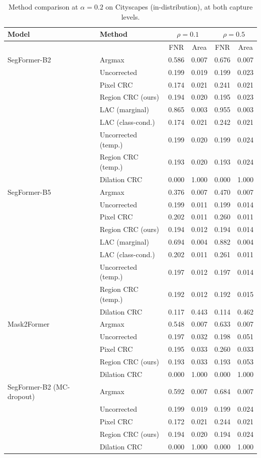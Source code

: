 \begin{table}[t]
\centering
\caption{Method comparison at $\alpha=0.2$ on Cityscapes (in-distribution), at both capture levels.}
\label{tab:baselines}
\scriptsize
\setlength{\tabcolsep}{2.5pt}
\begin{tabular}{llcccc}
\toprule
Model & Method & \multicolumn{2}{c}{$\rho=0.1$} & \multicolumn{2}{c}{$\rho=0.5$} \\
\midrule
 & & FNR & Area & FNR & Area \\
\midrule
SegFormer-B2 & Argmax & 0.586 & 0.007 & 0.676 & 0.007 \\
 & Uncorrected & 0.199 & 0.019 & 0.199 & 0.023 \\
 & Pixel CRC & 0.174 & 0.021 & 0.241 & 0.021 \\
 & Region CRC (ours) & 0.194 & 0.020 & 0.195 & 0.023 \\
 & LAC (marginal) & 0.865 & 0.003 & 0.955 & 0.003 \\
 & LAC (class-cond.) & 0.174 & 0.021 & 0.242 & 0.021 \\
 & Uncorrected (temp.) & 0.199 & 0.020 & 0.199 & 0.024 \\
 & Region CRC (temp.) & 0.193 & 0.020 & 0.193 & 0.024 \\
 & Dilation CRC & 0.000 & 1.000 & 0.000 & 1.000 \\
\addlinespace
SegFormer-B5 & Argmax & 0.376 & 0.007 & 0.470 & 0.007 \\
 & Uncorrected & 0.199 & 0.011 & 0.199 & 0.014 \\
 & Pixel CRC & 0.202 & 0.011 & 0.260 & 0.011 \\
 & Region CRC (ours) & 0.194 & 0.012 & 0.194 & 0.014 \\
 & LAC (marginal) & 0.694 & 0.004 & 0.882 & 0.004 \\
 & LAC (class-cond.) & 0.202 & 0.011 & 0.261 & 0.011 \\
 & Uncorrected (temp.) & 0.197 & 0.012 & 0.197 & 0.014 \\
 & Region CRC (temp.) & 0.192 & 0.012 & 0.192 & 0.015 \\
 & Dilation CRC & 0.117 & 0.443 & 0.114 & 0.462 \\
\addlinespace
Mask2Former & Argmax & 0.548 & 0.007 & 0.633 & 0.007 \\
 & Uncorrected & 0.197 & 0.032 & 0.198 & 0.051 \\
 & Pixel CRC & 0.195 & 0.033 & 0.260 & 0.033 \\
 & Region CRC (ours) & 0.193 & 0.033 & 0.193 & 0.053 \\
 & Dilation CRC & 0.000 & 1.000 & 0.000 & 1.000 \\
\addlinespace
SegFormer-B2 (MC-dropout) & Argmax & 0.592 & 0.007 & 0.684 & 0.007 \\
 & Uncorrected & 0.199 & 0.019 & 0.199 & 0.024 \\
 & Pixel CRC & 0.172 & 0.021 & 0.244 & 0.021 \\
 & Region CRC (ours) & 0.194 & 0.020 & 0.194 & 0.024 \\
 & Dilation CRC & 0.000 & 1.000 & 0.000 & 1.000 \\
\bottomrule
\end{tabular}
\end{table}
